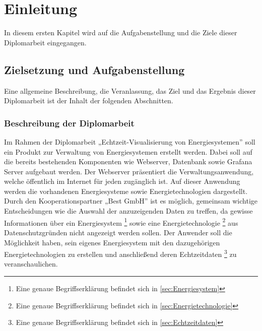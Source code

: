 \chapter{Einleitung}
In diesem ersten Kapitel wird auf die Aufgabenstellung und die Ziele dieser Diplomarbeit eingegangen. 


\section{Zielsetzung und Aufgabenstellung}
Eine allgemeine Beschreibung, die Veranlassung, das Ziel und das Ergebnis dieser Diplomarbeit ist der Inhalt der folgenden Abschnitten.


\subsection{Beschreibung der Diplomarbeit}
Im Rahmen der Diplomarbeit „Echtzeit-Visualisierung von Energiesystemen” soll ein Produkt zur Verwaltung von Energiesystemen erstellt werden. Dabei soll auf die bereits bestehenden Komponenten wie Webserver, Datenbank sowie Grafana Server aufgebaut werden. Der Webserver präsentiert die Verwaltungsanwendung, welche öffentlich im Internet für jeden zugänglich ist. Auf dieser Anwendung werden die vorhandenen Energiesysteme sowie Energietechnologien dargestellt.
Durch den Kooperationspartner „Best GmbH” ist es möglich, gemeinsam wichtige Entscheidungen wie die Auswahl der anzuzeigenden Daten zu treffen, da gewisse Informationen über ein Energiesystem \footnote{Eine genaue Begriffserklärung befindet sich in \ref{sec:Energiesystem} } sowie eine Energietechnologie \footnote{Eine genaue Begriffserklärung befindet sich in \ref{sec:Energietechnologie}} aus Datenschutzgründen nicht angezeigt werden sollen. Der Anwender soll die Möglichkeit haben, sein eigenes Energiesystem mit den dazugehörigen Energietechnologien zu erstellen und anschließend deren Echtzeitdaten \footnote{Eine genaue Begriffserklärung befindet sich in \ref{sec:Echtzeitdaten}} zu veranschaulichen. 




\newpage
